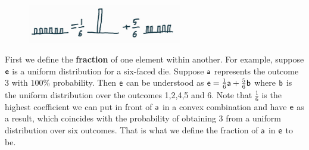 \begin{figure}[h]
	\centering
	\includegraphics[width=0.6\textwidth]{tempimages/Fraction.jpg}
\end{figure}

First we define the \textbf{fraction} of one element within another. For example, suppose $\ens$ is a uniform distribution for a six-faced die. Suppose $\ens[a]$ represents the outcome 3 with $100\%$ probability. Then $\ens$ can be understood as $\ens = \frac{1}{6} \ens[a] + \frac{5}{6} \ens[b]$ where $\ens[b]$ is the uniform distribution over the outcomes 1,2,4,5 and 6. Note that $\frac{1}{6}$ is the highest coefficient we can put in front of $\ens[a]$ in a convex combination and have $\ens$ as a result, which coincides with the probability of obtaining 3 from a uniform distribution over six outcomes. That is what we define the fraction of $\ens[a]$ in $\ens$ to be.

